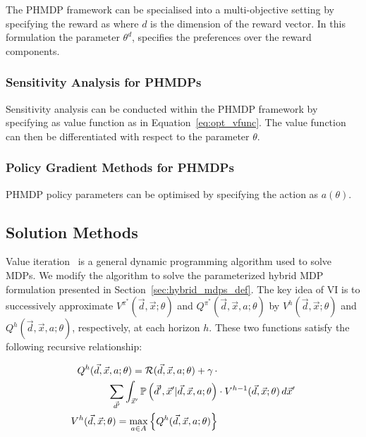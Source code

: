 The PHMDP framework can be specialised into a multi-objective setting by specifying the reward as {\footnotesize \MORewardFunc} where {\footnotesize $ d $} is the dimension of the reward vector. In this formulation the parameter {\footnotesize $ \theta^{d} $}, specifies the preferences over the reward components.

\subsubsection{Sensitivity Analysis for PHMDPs}

Sensitivity analysis can be conducted within the PHMDP framework by specifying as value function as in Equation~\eqref{eq:opt_vfunc}. The value function can then be differentiated with respect to the parameter {\footnotesize $ \theta $}.

\subsubsection{Policy Gradient Methods for PHMDPs}

PHMDP policy parameters can be optimised by specifying the action {\footnotesize \Action} as {\footnotesize $ a(\theta) $}.

\subsection{Solution Methods}

Value iteration~\parencite{Bellman_PU_1957} is a general dynamic programming algorithm used to solve MDPs. We modify the algorithm to solve the parameterized hybrid MDP formulation presented in Section~\ref{sec:hybrid_mdps_def}. The key idea of VI is to successively approximate {\footnotesize $V^{\pi^{*}}(\vec{d}, \vec{x}; \theta)$} and {\footnotesize $Q^{\pi^{*}}(\vec{d}, \vec{x}, a; \theta)$} by {\footnotesize $V^{h}(\vec{d}, \vec{x}; \theta)$} and {\footnotesize $Q^{h}(\vec{d}, \vec{x}, a; \theta)$}, respectively, at each horizon {\footnotesize$h$}. These two functions satisfy the following recursive relationship:

{\footnotesize 
    \abovedisplayskip=0pt
    \belowdisplayskip=0pt
    \begin{align}
        Q^{h}(\vec{d}, \vec{x}, a; \theta) = \mathcal{R}(\vec{d}, \vec{x}, a; \theta) + \gamma \, \cdot &  \nonumber \\ 
        \sum_{\vec{d}'} \int_{\vec{x}'} \mathbb{P}\left({\vec{d}', \vec{x}' | \vec{d}, \vec{x}, a; \theta}\right) & \cdot V^{h-1}(\vec{d}, \vec{x}; \theta) \, d\vec{x}'  \label{eq:vi_qfunc} \\
        V^{h}(\vec{d}, \vec{x}; \theta) = \max_{a \in A} \left\{ Q^{h}(\vec{d}, \vec{x}, a; \theta) \right\} & \label{eq:vi_vfunc}
    \end{align}
}%

